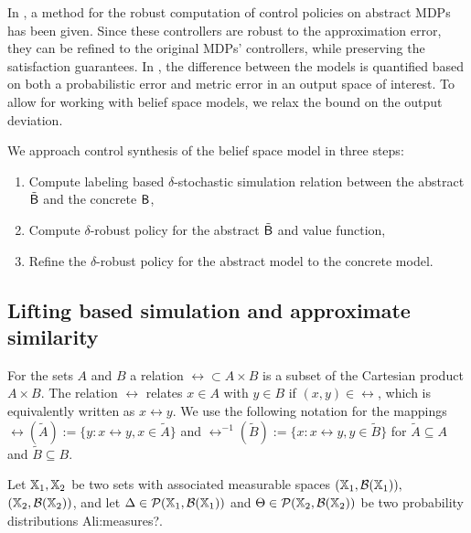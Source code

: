 \documentclass{ifacconf}
\renewcommand{\axx}[1]{{\color{orange} Ali:#1}}
\begin{document}
In \citet{tech_report_TACAS}, a method for the robust computation of control policies on abstract MDPs has been given.  Since these controllers are robust to the approximation error,  they can be refined to the original MDPs' controllers, while preserving the satisfaction guarantees. 
In \citet{tech_report_TACAS}, the difference between the models is quantified based on both a probabilistic error and metric error in an output space of interest. 
To allow for working with belief space models, we relax the bound on the output deviation.


We approach control synthesis of the belief space model in three steps:
\begin{enumerate}
\item Compute labeling based $\delta$-stochastic  simulation relation between  the abstract $\tilde{\mathsf{B}}$ and the concrete $\mathsf{B}$,
\item Compute $\delta$-robust policy for the abstract $\tilde{\mathsf{B}}$ and value function,
\item Refine the $\delta$-robust policy for the abstract model to the concrete model.
\end{enumerate}
\subsection{Lifting based simulation  and approximate similarity}
For the sets $A$ and $B$ a relation $\rel\subset A\times B$ is a subset of the Cartesian product $A\times B$. The relation $\rel$ relates $x\in A$ with $y\in B$ if $(x,y)\in\rel$, which is equivalently written as $x\rel y$. 
We use the following notation for the mappings  $\rel(\tilde A):=\{y: x\rel y, x\in \tilde A\}$ and  $\rel^{-1}( \tilde B):=\{x: x\rel y, y\in \tilde B\}$ for   $\tilde A\subseteq A$ and $\tilde B \subseteq B$.

	Let ${\mathbb{X}}_1,{\mathbb{X}}_2$ be two sets with associated measurable spaces $({\mathbb{X}}_1,\mathcal B({\mathbb{X}}_1)),$ $({\mathbb{X}}_2,\mathcal B({\mathbb{X}}_2))$,
	and let   $\Delta\in \mathcal{P}({\mathbb{X}}_1,\mathcal B({\mathbb{X}}_1)) $ and  $\Theta\in \mathcal{P}({\mathbb{X}}_2,\mathcal B({\mathbb{X}}_2)) $ be two probability distributions \axx{measures?}. 
%	
\end{document}
